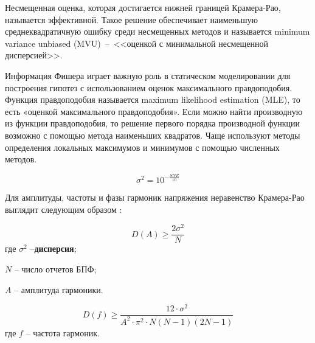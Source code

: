 



Несмещенная оценка, которая достигается нижней границей Крамера-Рао, называется эффективной. Такое решение обеспечивает наименьшую среднеквадратичную ошибку среди несмещенных методов и называется minimum variance unbiased (MVU)~--~<<оценкой с минимальной несмещенной дисперсией>>.

Информация Фишера играет важную роль в статическом моделировании для построения гипотез с использованием оценок максимального правдоподобия. Функция правдоподобия называется maximum likelihood estimation (MLE), то есть «оценкой максимального правдоподобия». Если можно найти производную из функции правдоподобия, то решение первого порядка производной функции возможно с помощью метода наименьших квадратов. Чаще используют методы определения локальных максимумов и минимумов с помощью численных методов.

\begin{equation}
	\label{eq:equation1.4.1}
	\sigma^2 = 10^{- \frac{SNR}{10}}
\end{equation}

Для амплитуды, частоты и фазы гармоник напряжения неравенство Крамера-Рао выглядит следующим образом \cite{kay1993fundamentals}:

\begin{equation}
	\label{eq:equation1.4.2}
	D(A) \geqslant \frac{2 \sigma^2}{N}
\end{equation}
где $\sigma^2$ --\textbf{дисперсия};

$N$ -- число отчетов БПФ;

$A$ -- амплитуда гармоники.

\begin{equation}
	\label{eq:equation1.4.3}
	D(f) \geqslant \frac{12 \cdot \sigma^2}{A^2 \cdot \pi^2 \cdot N(N-1)(2N-1)}
\end{equation}
где $f$ -- частота гармоник.

